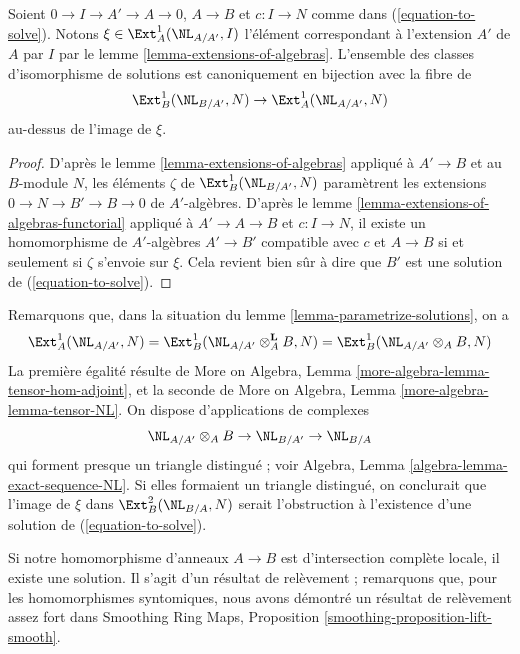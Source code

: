 \begin{lemma}
\label{lemma-parametrize-solutions}
Soient $0 \to I \to A' \to A \to 0$, $A \to B$ et $c : I \to N$ comme dans
(\ref{equation-to-solve}). Notons $\xi \in \Ext^1_A(\NL_{A/A'}, I)$
l'élément correspondant à l'extension $A'$ de $A$ par $I$ par le
lemme \ref{lemma-extensions-of-algebras}. L'ensemble des classes d'isomorphisme
de solutions est canoniquement en bijection avec la fibre de
$$
\Ext^1_B(\NL_{B/A'}, N) \to \Ext^1_A(\NL_{A/A'}, N)
$$
au-dessus de l'image de $\xi$.
\end{lemma}

\begin{proof}
D'après le lemme \ref{lemma-extensions-of-algebras} appliqué à $A' \to B$ et au
$B$-module $N$, les éléments $\zeta$ de $\Ext^1_B(\NL_{B/A'}, N)$
paramètrent les extensions $0 \to N \to B' \to B \to 0$ de $A'$-algèbres.
D'après le lemme \ref{lemma-extensions-of-algebras-functorial} appliqué
à $A' \to A \to B$ et $c : I \to N$, il existe un homomorphisme de $A'$-algèbres
$A' \to B'$ compatible avec $c$ et $A \to B$ si et seulement si
$\zeta$ s'envoie sur $\xi$. Cela revient bien sûr à dire que $B'$ est une
solution de (\ref{equation-to-solve}).
\end{proof}

\begin{remark}
\label{remark-parametrize-solutions}
Remarquons que, dans la situation du lemme \ref{lemma-parametrize-solutions},
on a
$$
\Ext^1_A(\NL_{A/A'}, N) =
\Ext^1_B(\NL_{A/A'} \otimes_A^\mathbf{L} B, N) =
\Ext^1_B(\NL_{A/A'} \otimes_A B, N)
$$
La première égalité résulte de
More on Algebra, Lemma \ref{more-algebra-lemma-tensor-hom-adjoint}, et
la seconde de
More on Algebra, Lemma \ref{more-algebra-lemma-tensor-NL}.
On dispose d'applications de complexes
$$
\NL_{A/A'} \otimes_A B \to \NL_{B/A'} \to \NL_{B/A}
$$
qui forment presque un triangle distingué ; voir
Algebra, Lemma \ref{algebra-lemma-exact-sequence-NL}.
Si elles formaient un triangle distingué, on conclurait
que l'image de $\xi$ dans $\Ext^2_B(\NL_{B/A}, N)$
serait l'obstruction à l'existence d'une solution de
(\ref{equation-to-solve}).
\end{remark}

\noindent
Si notre homomorphisme d'anneaux $A \to B$ est d'intersection complète locale, il existe
une solution. Il s'agit d'un résultat de relèvement ; remarquons que,
pour les homomorphismes syntomiques, nous avons démontré un résultat de relèvement assez fort dans
Smoothing Ring Maps, Proposition \ref{smoothing-proposition-lift-smooth}.

